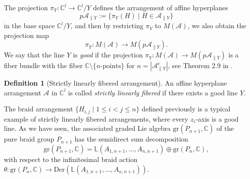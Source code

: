 \documentclass[a4paper,12pt]{article}
\newcommand{\C}{\mathbb{C}}
\theoremstyle{definition}
\newtheorem{df}[thm]{Definition}
\theoremstyle{remark}
\begin{document}
The 
projection $\pi_{Y}\colon \C^{l}\to \C^{l}/Y$
defines the arrangement of affine hyperplanes 
\[
	p\mathcal{A}_{\parallel Y}:=\{\pi_{Y}(H)\mid H\in \mathcal{A}_{\parallel Y}\}
\] 
in the base space $\C^{l}/Y$,
and then by restricting $\pi_{Y}$ to $M(\mathcal{A})$, we also obtain 
the projection map 
\[
	\pi_{Y}\colon M(\mathcal{A})\to M(p\mathcal{A}_{\parallel Y}).
\]
We say that 
the line $Y$ is \emph{good} if
the  projection 
$\pi_{Y}\colon M(\mathcal{A})\to M(p\mathcal{A}_{\parallel Y})$
is a fiber bundle with the fiber $\C\setminus\{n\text{-points}\}$ for $n=|\mathcal{A}_{\parallel Y}^{c}|$,
see Theorem 2.9 in \cite{Tera1}.
\begin{df}[Strictly linearly fibered arrangement]
	An affine hyperplane arrangement $\mathcal{A}$ in $\C^{l}$ is called \emph{strictly linearly fibered}
	 if there exists a good line $Y$.
\end{df}

The braid arrangement 
$\{H_{i,j}\mid 1\le i<j\le n\}$ 
defined previously
is a typical example of strictly linearly fibered arrangements,
where every $z_{i}$-axis is a good line.
As we have seen, the associated graded Lie algebra $\mathrm{gr}(P_{n+1},\mathbb{C})$ of the pure braid group $P_{n+1}$ has the semidirect sum decomposition
\[	\mathrm{gr}(P_{n+1},\mathbb{C})
	=\mathbb{L}(A_{1,n+1},\ldots,A_{n,n+1})\oplus \mathrm{gr}(P_{n},\mathbb{C}),
\]
with respect to the infinitesimal braid action $\theta\colon \mathrm{gr}(P_{n},\mathbb{C})\to \mathrm{Der}(\mathbb{L}(A_{1,n+1},\ldots,A_{n,n+1}))$.
\end{document}

